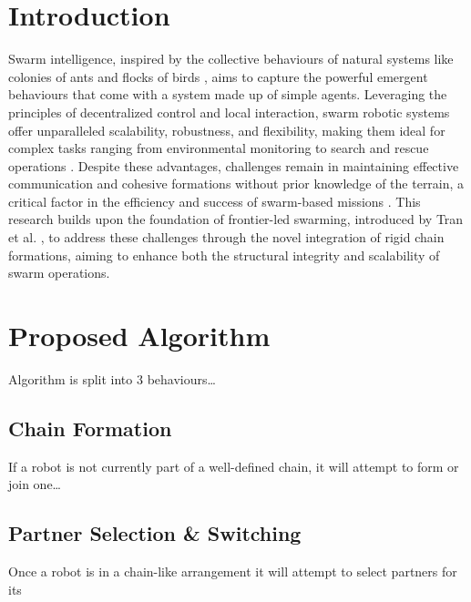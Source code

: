 \documentclass[runningheads]{llncs}
\begin{document}
\section{Introduction}
Swarm intelligence, inspired by the collective behaviours of natural systems like colonies of ants and flocks of birds \cite{garnier2007}, aims to capture the powerful emergent behaviours that come with a system made up of simple agents\cite{mataric1995}.
Leveraging the principles of decentralized control and local interaction, swarm robotic systems offer unparalleled scalability, robustness, and flexibility, making them ideal for complex tasks ranging from environmental monitoring to search and rescue operations \cite{hamann2018,ijspeert2001}. 
Despite these advantages, challenges remain in maintaining effective communication and cohesive formations without prior knowledge of the terrain, a critical factor in the efficiency and success of swarm-based missions \cite{xu2014}. 
This research builds upon the foundation of frontier-led swarming, introduced by Tran et al. \cite{tran2022}, to address these challenges through the novel integration of rigid chain formations, aiming to enhance both the structural integrity and scalability of swarm operations.






\section{Proposed Algorithm}
Algorithm is split into 3 behaviours\dots

\subsection{Chain Formation}
If a robot is not currently part of a well-defined chain, it will attempt to form or join one\dots

\subsection{Partner Selection \& Switching}
Once a robot is in a chain-like arrangement it will attempt to select partners for its 
\end{document}
